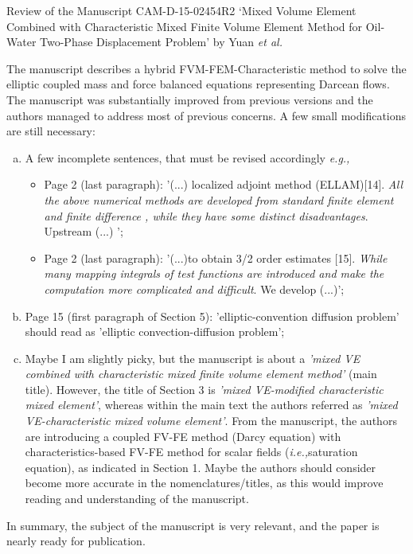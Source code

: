 \documentclass[14pt,twoside]{report}
\newcommand{\ie}{{\it i.e.,}}
\newcommand{\eg}{{\it e.g.,}}
\begin{document}
{
  } 


\clearpage



\begin{center}
  {\Large Review of the Manuscript CAM-D-15-02454R2 `Mixed Volume Element Combined with Characteristic Mixed Finite Volume Element Method for Oil-Water Two-Phase Displacement Problem' by Yuan {\it et al.}}
\end{center}

The manuscript describes a hybrid FVM-FEM-Characteristic method to solve the elliptic coupled mass and force balanced equations representing Darcean flows. The manuscript was substantially improved from previous versions and the authors managed to address most of previous concerns. A few small modifications are still necessary:
  \begin{enumerate}[a)]
    \item A few incomplete sentences, that must be revised accordingly \eg
       \begin{itemize}
         \item Page 2 (last paragraph): '(...) localized adjoint method (ELLAM)[14]. {\it All the above numerical methods are developed from standard finite element and finite difference , while they have some distinct disadvantages}. Upstream (...) ';
         \item Page 2 (last paragraph): '(...)to obtain 3/2 order estimates [15]. {\it While many mapping integrals of test functions are introduced and make the computation  more complicated and difficult}. We develop (...)';
       \end{itemize}
    \item Page 15 (first paragraph of Section 5): 'elliptic-convention diffusion problem' should read as 'elliptic convection-diffusion problem';
    \item Maybe I am slightly picky, but the manuscript is about a {\it 'mixed VE combined with characteristic mixed finite volume element method'} (main title). However, the title of Section 3 is {\it 'mixed VE-modified characteristic mixed element'}, whereas within the main text the authors referred as {\it 'mixed VE-characteristic mixed volume element'}. From the manuscript, the authors are introducing a coupled FV-FE method (Darcy equation) with characteristics-based FV-FE method for scalar fields (\ie saturation equation), as indicated in Section 1. Maybe the authors should consider become more accurate in the nomenclatures/titles, as this would improve reading and understanding of the manuscript.   
  \end{enumerate}
In summary, the subject of the manuscript is very relevant, and the paper is nearly ready for publication.
\end{document}
